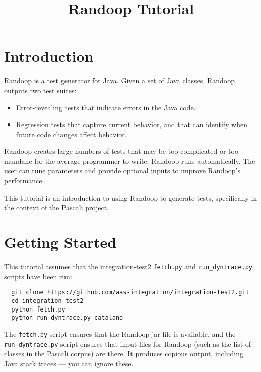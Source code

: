 \documentclass[11pt, oneside]{article} %
\title{Randoop Tutorial}
\newcommand{\cmd}[1]{{\texttt{#1}}}
\begin{document}
\maketitle

\section{Introduction}
Randoop is a test generator for Java.
Given a set of Java classes, Randoop outputs two test suites:
\begin{itemize}
\item Error-revealing tests that indicate errors in the Java code.
\item Regression tests that capture current behavior, and that can identify
  when future code changes affect behavior.
\end{itemize}
Randoop creates large numbers of tests that may be too complicated or too
mundane for the average programmer to write.
Randoop runs automatically.  The user can tune parameters and provide
\href{https://randoop.github.io/randoop/manual/#command-line-options}{optional inputs} to improve Randoop's performance.

This tutorial is an introduction to using Randoop to generate tests, specifically in the context of the Pascali project.

\section{Getting Started}
This tutorial assumes that the integration-test2 \cmd{fetch.py} and \cmd{run\_dyntrace.py}
scripts have been run:
\begin{verbatim}
  git clone https://github.com/aas-integration/integration-test2.git
  cd integration-test2
  python fetch.py
  python run_dyntrace.py catalano
\end{verbatim}
The \cmd{fetch.py} script ensures that the Randoop jar file is available,
and the \cmd{run\_dyntrace.py} script ensures that input files for Randoop (such as
the list of classes in the Pascali corpus) are there.
It produces copious output, including Java stack traces --- you can ignore these.
\end{document}
